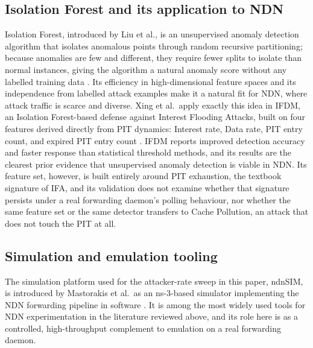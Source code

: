\subsection{Isolation Forest and its application to NDN}
Isolation Forest, introduced by Liu et al., is an unsupervised anomaly detection algorithm that isolates anomalous points through random recursive partitioning; because anomalies are few and different, they require fewer splits to isolate than normal instances, giving the algorithm a natural anomaly score without any labelled training data \cite{liu2008isolation}. Its efficiency in high-dimensional feature spaces and its independence from labelled attack examples make it a natural fit for NDN, where attack traffic is scarce and diverse. Xing et al.\ apply exactly this idea in IFDM, an Isolation Forest-based defense against Interest Flooding Attacks, built on four features derived directly from PIT dynamics: Interest rate, Data rate, PIT entry count, and expired PIT entry count \cite{xing2021isolation}. IFDM reports improved detection accuracy and faster response than statistical threshold methods, and its results are the clearest prior evidence that unsupervised anomaly detection is viable in NDN. Its feature set, however, is built entirely around PIT exhaustion, the textbook signature of IFA, and its validation does not examine whether that signature persists under a real forwarding daemon's polling behaviour, nor whether the same feature set or the same detector transfers to Cache Pollution, an attack that does not touch the PIT at all.

\subsection{Simulation and emulation tooling}
The simulation platform used for the attacker-rate sweep in this paper, ndnSIM, is introduced by Mastorakis et al.\ as an ns-3-based simulator implementing the NDN forwarding pipeline in software \cite{mastorakis2015ndnsim}. It is among the most widely used tools for NDN experimentation in the literature reviewed above, and its role here is as a controlled, high-throughput complement to emulation on a real forwarding daemon.

